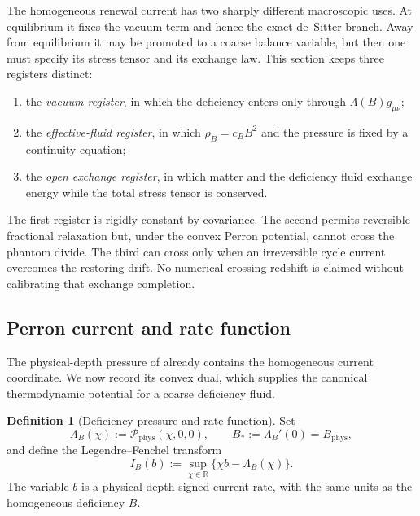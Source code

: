 \documentclass[11pt]{article}
\theoremstyle{definition}
\newtheorem{definition}[theorem]{Definition}
\theoremstyle{remark}
\newcommand{\R}{\mathbb R}
\newcommand{\Bphys}{B_{\mathrm{phys}}}
\newcommand{\Pphys}{\mathcal P_{\mathrm{phys}}}
\begin{document}
The homogeneous renewal current has two sharply different macroscopic uses.
At equilibrium it fixes the vacuum term and hence the exact de~Sitter branch.
Away from equilibrium it may be promoted to a coarse balance variable, but then
one must specify its stress tensor and its exchange law.  This section keeps
three registers distinct:
\begin{enumerate}[label=\textup{(\roman*)},leftmargin=2.6em]
\item the \emph{vacuum register}, in which the deficiency enters only through
      \(\Lambda(B)g_{\mu\nu}\);
\item the \emph{effective-fluid register}, in which
      \(\rho_B=c_BB^2\) and the pressure is fixed by a continuity equation;
\item the \emph{open exchange register}, in which matter and the deficiency
      fluid exchange energy while the total stress tensor is conserved.
\end{enumerate}
The first register is rigidly constant by covariance.  The second permits
reversible fractional relaxation but, under the convex Perron potential, cannot
cross the phantom divide.  The third can cross only when an irreversible cycle
current overcomes the restoring drift.  No numerical crossing redshift is
claimed without calibrating that exchange completion.

\subsection{Perron current and rate function}
\label{subsec:dark-energy-rate-function}

The physical-depth pressure of  already
contains the homogeneous current coordinate.  We now record its convex dual,
which supplies the canonical thermodynamic potential for a coarse deficiency
fluid.

\begin{definition}[Deficiency pressure and rate function]
\label{def:deficiency-rate-function}
Set
\[
  \Lambda_B(\chi):=\Pphys(\chi,0,0),
  \qquad B_*:=\Lambda_B'(0)=\Bphys,
\]
and define the Legendre--Fenchel transform
\[
  I_B(b):=\sup_{\chi\in\R}\{\chi b-\Lambda_B(\chi)\}.
\]
The variable \(b\) is a physical-depth signed-current rate, with the same units
as the homogeneous deficiency \(B\).
\end{definition}
\end{document}
